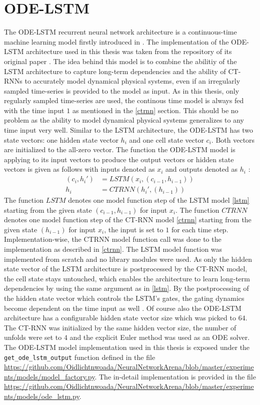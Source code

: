 \documentclass[draft,final]{vutinfth} %
\begin{document}
    \section{ODE-LSTM} \label{odelstm}
    The ODE-LSTM recurrent neural network architecture is a continuous-time machine learning model firstly introduced in \cite{ODELSTM}.
    The implementation of the ODE-LSTM architecture used in this thesis was taken from the repository of its original paper \cite{ODELSTM}.
    The idea behind this model is to combine the abilitiy of the LSTM architecture to capture long-term dependencies and the ability of CT-RNNs to accurately model dynamical physical systems, even if an irregularly sampled time-series is provided to the model as input.
    As in this thesis, only regularly sampled time-series are used, the continous time model is always fed with the time input $1$ as mentioned in the \ref{ctrnn} section. 
    This should be no problem as the ability to model dynamical physical systems generalizes to any time input very well.
    Similar to the LSTM architecture, the ODE-LSTM has two state vectors: one hidden state vector $h_i$ and one cell state vector $c_i$. Both vectors are initialized to the all-zero vector.
    The function the ODE-LSTM model is applying to its input vectors to produce the output vectors or hidden state vectors is given as follows with inputs denoted as $x_i$ and outputs denoted as $h_i$ \cite[p. 5]{ODELSTM}:
    \begin{align}
    (c_i,h_i') &= LSTM(x_i, (c_{i-1}, h_{i-1})) \\
    h_i &= CTRNN(h_i', (h_{i-1}))
    \end{align}
    The function $LSTM$ denotes one model function step of the LSTM model \ref{lstm} starting from the given state $(c_{i-1}, h_{i-1})$ for input $x_i$.
    The function $CTRNN$ denotes one model function step of the CT-RNN model \ref{ctrnn} starting from the given state $(h_{i-1})$ for input $x_i$, the input is set to $1$ for each time step.
    Implementation-wise, the CTRNN model function call was done to the implementation as described in \ref{ctrnn}.
    The LSTM model function was implemented from scratch and no library modules were used. 
    As only the hidden state vector of the LSTM architecture is postprocessed by the CT-RNN model, the cell state stays untouched, which enables the architecture to learn long-term dependencies by using the same argument as in \ref{lstm}.
    By the postprocessing of the hidden state vector which controls the LSTM's gates, the gating dynamics become dependent on the time input as well \cite[p. 4]{ODELSTM}.
    Of course also the ODE-LSTM architecture has a configurable hidden state vector size which was picked to $64$.
    The CT-RNN was initialized by the same hidden vector size, the number of unfolds were set to $4$ and the explicit Euler method was used as an ODE solver.
    The ODE-LSTM model implementation used in this thesis is exposed under the \texttt{get\_ode\_lstm\_output} function defined in the file \url{https://github.com/Oidlichtnwoada/NeuralNetworkArena/blob/master/experiments/models/model_factory.py}.
    The in-detail implementation is provided in the file \url{https://github.com/Oidlichtnwoada/NeuralNetworkArena/blob/master/experiments/models/ode_lstm.py}.
\end{document}
